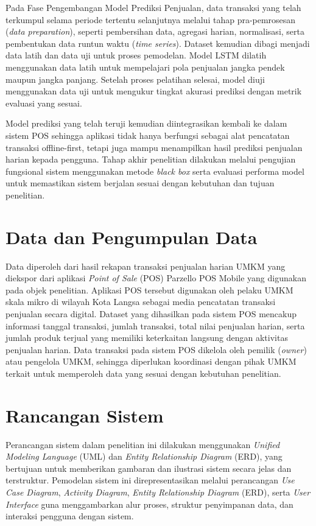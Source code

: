 Pada Fase Pengembangan Model Prediksi Penjualan, data transaksi yang telah terkumpul selama periode tertentu selanjutnya melalui tahap pra-pemrosesan (\textit{data preparation}), seperti pembersihan data, agregasi harian, normalisasi, serta pembentukan data runtun waktu (\textit{time series}). Dataset kemudian dibagi menjadi data latih dan data uji untuk proses pemodelan. Model LSTM dilatih menggunakan data latih untuk mempelajari pola penjualan jangka pendek maupun jangka panjang. Setelah proses pelatihan selesai, model diuji menggunakan data uji untuk mengukur tingkat akurasi prediksi dengan metrik evaluasi yang sesuai.

Model prediksi yang telah teruji kemudian diintegrasikan kembali ke dalam sistem POS sehingga aplikasi tidak hanya berfungsi sebagai alat pencatatan transaksi offline-first, tetapi juga mampu menampilkan hasil prediksi penjualan harian kepada pengguna. Tahap akhir penelitian dilakukan melalui pengujian fungsional sistem menggunakan metode \textit{black box} serta evaluasi performa model untuk memastikan sistem berjalan sesuai dengan kebutuhan dan tujuan penelitian.

\section{Data dan Pengumpulan Data}
Data diperoleh dari hasil rekapan transaksi penjualan harian UMKM yang diekspor dari aplikasi \textit{Point of Sale} (POS) Parzello POS Mobile yang digunakan pada objek penelitian. Aplikasi POS tersebut digunakan oleh pelaku UMKM skala mikro di wilayah Kota Langsa sebagai media pencatatan transaksi penjualan secara digital. Dataset yang dihasilkan pada sistem POS mencakup informasi tanggal transaksi, jumlah transaksi, total nilai penjualan harian, serta jumlah produk terjual yang memiliki keterkaitan langsung dengan aktivitas penjualan harian. Data transaksi pada sistem POS dikelola oleh pemilik (\textit{owner}) atau pengelola UMKM, sehingga diperlukan koordinasi dengan pihak UMKM terkait untuk memperoleh data yang sesuai dengan kebutuhan penelitian.

\section{Rancangan Sistem}
Perancangan sistem dalam penelitian ini dilakukan menggunakan \textit{Unified Modeling Language} (UML) dan \textit{Entity Relationship Diagram} (ERD), yang bertujuan untuk memberikan gambaran dan ilustrasi sistem secara jelas dan terstruktur. Pemodelan sistem ini direpresentasikan melalui perancangan \textit{Use Case Diagram}, \textit{Activity Diagram}, \textit{Entity Relationship Diagram} (ERD), serta \textit{User Interface} guna menggambarkan alur proses, struktur penyimpanan data, dan interaksi pengguna dengan sistem.

